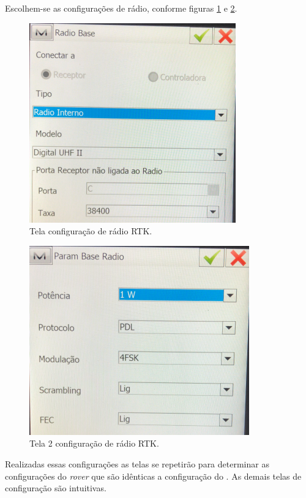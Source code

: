 Escolhem-se as configurações de rádio, conforme figuras \ref{controladora_radio} e \ref{controladora_radio2}.

\begin{figure}[H]
\centering
\includegraphics[scale=0.5]{pfc_pdf_files/img/controladora_radio.png} %
\caption{Tela configuração de rádio RTK.}
\label{controladora_radio}
\end{figure}

\begin{figure}[H]
\centering
\includegraphics[scale=0.4]{pfc_pdf_files/img/controladora_radio2.png} %
\caption{Tela 2 configuração de rádio RTK.}
\label{controladora_radio2}
\end{figure}

Realizadas essas configurações as telas se repetirão para determinar as configurações do \textit{rover} que são idênticas a configuração do . As demais telas de configuração são intuitivas.

